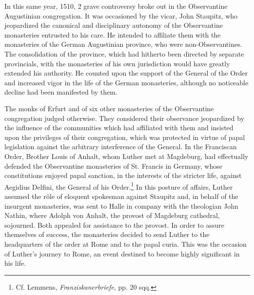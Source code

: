 In this same year, 1510, 2 grave controversy broke out in the
Observantine Augustinian congregation. It was occasioned by the
vicar, John Staupitz, who jeopardized the canonical and disciplinary
autonomy of the Observantine monasteries entrusted to his care. He
intended to affiliate them with the monasteries of the German Augustinian
province, who were non-Observantines. The consolidation of
the province, which had hitherto been directed by separate provincials,
with the monasteries of his own jurisdiction would have greatly
extended his authority. He counted upon the support of the General
of the Order and increased vigor in the life of the German
monasteries, although no noticeable decline had been manifested by
them.

The monks of Erfurt and of six other monasteries of the Observantine
congregation judged otherwise. They considered their observance
jeopardized by the influence of the communities which had affiliated
with them and insisted upon the privileges of their congregation,
which was protected in virtue of papal legislation against the arbitrary
interference of the General. In the Franciscan Order, Brother
Louis of Anhalt, whom Luther met at Magdeburg, had effectually
defended the Observantine monasteries of St. Francis in Germany,
whose constitutions enjoyed papal sanction, in the interests of the
stricter life, against Aegidius Delfini, the General of his Order.\footnote
{Cf. Lemmens, \textit{Franziskanerbriefe}, pp. 20 sqq.}
In this posture of affairs, Luther assumed the rôle of eloquent spokesman
against Staupitz and, in behalf of the insurgent monasteries,
was sent to Halle in company with the theologian John Nathin,
where Adolph von Anhalt, the provost of Magdeburg cathedral, sojourned.
Both appealed for assistance to the provost. In order to
assure themselves of success, the monasteries decided to send Luther
to the headquarters of the order at Rome and to the papal curia.
This was the occasion of Luther’s journey to Rome, an event destined
to become highly significant in his life.
